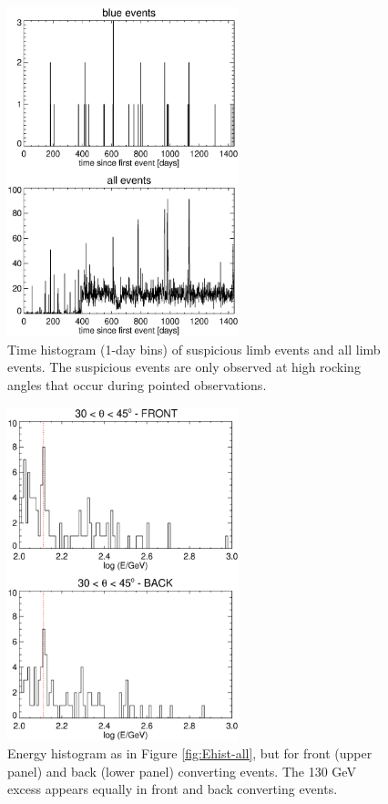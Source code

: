 \documentclass[aps,twocolumn,prd,superscriptaddress,showpacs,nofootinbib,fixfloat]{revtex4}
\begin{document}
\begin{figure}[p]
\centering
\includegraphics[width=0.6\textwidth]{plots/timehist.ps}
\caption{Time histogram (1-day bins) of suspicious limb events and all limb
events.  The suspicious events are only observed at high rocking
angles that occur during pointed observations.
}
\label{fig:timehist}
\end{figure}


\begin{figure}[p]
\centering
\includegraphics[width=0.6\textwidth]{plots/Ehist-frontback.ps}
\caption{Energy histogram as in Figure \ref{fig:Ehist-all}, but for front
  (upper panel) and back (lower panel) converting events.  The 130 GeV excess
  appears equally in front and back converting events. 
}
\label{fig:Ehist-frontback}
\end{figure}
\end{document}
